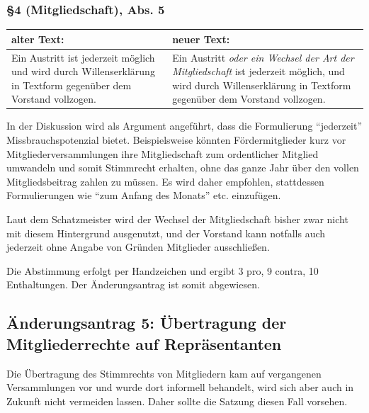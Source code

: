 \documentclass[a4paper,12pt]{scrartcl}
\begin{document}
\subsubsection*{§4 (Mitgliedschaft), Abs. 5}
\begin{longtable}[c]{@{}ll@{}}
\toprule
\begin{minipage}[b]{0.47\columnwidth}\raggedright\strut
alter Text:
\strut\end{minipage} &
\begin{minipage}[b]{0.47\columnwidth}\raggedright\strut
neuer Text:
\strut\end{minipage}\tabularnewline
\midrule
\endhead
\begin{minipage}[t]{0.47\columnwidth}\raggedright\strut
Ein Austritt ist jederzeit möglich und wird durch Willenserklärung in
Textform gegenüber dem Vorstand vollzogen.
\strut\end{minipage} &
\begin{minipage}[t]{0.47\columnwidth}\raggedright\strut
Ein Austritt \emph{oder ein Wechsel der Art der Mitgliedschaft} ist jederzeit
möglich, und wird durch Willenserklärung in Textform gegenüber dem
Vorstand vollzogen.
\strut\end{minipage}\tabularnewline
\bottomrule
\end{longtable}

In der Diskussion wird als Argument angeführt, dass die Formulierung
"`jederzeit"' Missbrauchspotenzial bietet. Beispielsweise könnten
Fördermitglieder kurz vor Mitgliederversammlungen ihre Mitgliedschaft zum
ordentlicher Mitglied umwandeln und somit Stimmrecht erhalten, ohne das ganze
Jahr über den vollen Mitgliedsbeitrag zahlen zu müssen. Es wird daher empfohlen,
stattdessen Formulierungen wie "`zum Anfang des Monats"' etc. einzufügen.

\newpage
Laut dem Schatzmeister wird der Wechsel der Mitgliedschaft bisher zwar nicht mit
diesem Hintergrund ausgenutzt, und der Vorstand kann notfalls auch jederzeit
ohne Angabe von Gründen Mitglieder ausschließen.

Die Abstimmung erfolgt per Handzeichen und ergibt 3 pro, 9 contra, 10
Enthaltungen. Der Änderungsantrag ist somit abgewiesen.


\subsection{Änderungsantrag 5: Übertragung der Mitgliederrechte auf
Repräsentanten}
Die Übertragung des Stimmrechts von Mitgliedern kam auf vergangenen
Versammlungen vor und wurde dort informell behandelt, wird sich aber
auch in Zukunft nicht vermeiden lassen. Daher sollte die Satzung diesen
Fall vorsehen.
\end{document}
